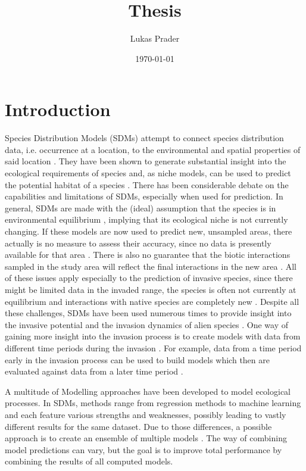 \documentclass[12pt,a4paper]{article}
\begin{document}
\title{Thesis}
\author{Lukas Prader}
\date{\today}
\maketitle

\newpage
\tableofcontents
\newpage

\section{Introduction}
Species Distribution Models (SDMs) attempt to connect species distribution data, i.e. occurrence at a location, to the environmental and spatial properties of said location \autocite{elith2009sdmtheory}.
They have been shown to generate substantial insight into the ecological requirements of species and, as niche models, can be used to predict the potential habitat of a species \autocite{araujo2006sdmchallenges}.
There has been considerable debate on the capabilities and limitations of SDMs, especially when used for prediction.
In general, SDMs are made with the (ideal) assumption that the species is in environmental equilibrium \autocite{elith2009sdmtheory}, implying that its ecological niche is not currently changing.
If these models are now used to predict new, unsampled areas, there actually is no measure to assess their accuracy, since no data is presently available for that area \autocite{araujo2006sdmchallenges}.
There is also no guarantee that the biotic interactions sampled in the study area will reflect the final interactions in the new area \autocite{elith2009sdmtheory}.
All of these issues apply especially to the prediction of invasive species, since there might be limited data in the invaded range, the species is often not currently at equilibrium and interactions with native species are completely new \autocite{mainali2015sdmprojecting}.
Despite all these challenges, SDMs have been used numerous times to provide insight into the invasive potential and the invasion dynamics of alien species \autocite{zimmermann2010sdmtrends}.
One way of gaining more insight into the invasion process is to create models with data from different time periods during the invasion \autocite{briscoe2019palmerisdm}.
For example, data from a time period early in the invasion process can be used to build models which then are evaluated against data from a later time period \autocite{barbet2018nigrithoraxsdm}.

A multitude of Modelling approaches have been developed to model ecological processes.
In SDMs, methods range from regression methods to machine learning and each feature various strengths and weaknesses, possibly leading to vastly different results for the same dataset.
Due to those differences, a possible approach is to create an ensemble of multiple models \autocite{araujo2007ensemble}.
The way of combining model predictions can vary, but the goal is to improve total performance by combining the results of all computed models.
\end{document}
